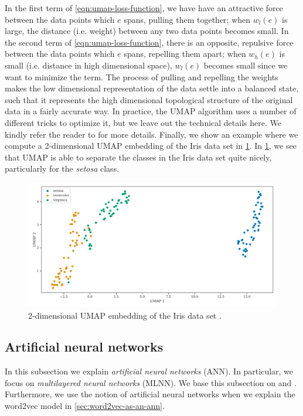 In the first term of \cref{eqn:umap-loss-function}, we have have an attractive force between the data points which $e$ spans, pulling them together; when $w_l(e)$ is large, the distance (i.e. weight) between any two data points becomes small. In the second term of \cref{eqn:umap-loss-function}, there is an opposite, repulsive force between the data points which $e$ spans, repelling them apart; when $w_h(e)$ is small (i.e. distance in high dimensional space), $w_l(e)$ becomes small since we want to minimize the term. The process of pulling and repelling the weights makes the low dimensional representation of the data settle into a balanced state, such that it represents the high dimensional topological structure of the original data in a fairly accurate way. In practice, the UMAP algorithm uses a number of different tricks to optimize it, but we leave out the technical details here. We kindly refer the reader to \cite{2018arXivUMAP} for more details. Finally, we show an example where we compute a 2-dimensional UMAP embedding of the Iris data set \cite{Fisher1936} in \cref{fig:umap-2d-example}. In \cref{fig:umap-2d-example}, we see that UMAP is able to separate the classes in the Iris data set quite nicely, particularly for the \textit{setosa} class.
\begin{figure}[H]
    \centering
    \includegraphics[width=\textwidth]{thesis/figures/umap-2d-example.pdf}
    \caption{2-dimensional UMAP embedding of the Iris data set \cite{Fisher1936}.}
    \label{fig:umap-2d-example}
\end{figure}

\subsection{Artificial neural networks}
\label{sec:artificial-neural-networks}
In this subsection we explain \textit{artificial neural networks} (ANN). In particular, we focus on \textit{multilayered neural networks} (MLNN). We base this subsection on \cite[Chapter 1]{Aggarwal18} and \cite{rong2016word2vec}. Furthermore, we use the notion of artificial neural networks when we explain the word2vec model in \cref{sec:word2vec-as-an-ann}.

